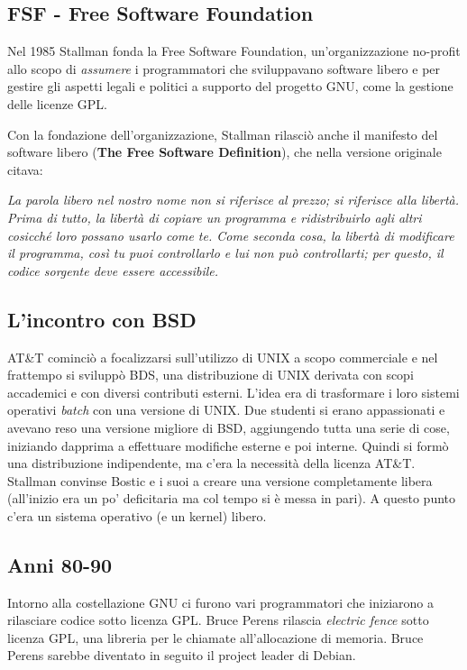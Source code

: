 \subsection{FSF - Free Software Foundation}

Nel 1985 Stallman fonda la Free Software Foundation, un'organizzazione no-profit allo scopo di \textit{assumere} i programmatori che sviluppavano software libero e per gestire gli aspetti legali e politici a supporto del progetto GNU, come la gestione delle licenze GPL.

Con la fondazione dell'organizzazione, Stallman rilasciò anche il manifesto del software libero (\textbf{The Free Software Definition}), che nella versione originale citava:

\begin{center}
	\textit{La parola libero nel nostro nome non si riferisce al prezzo; si riferisce alla libertà. Prima di tutto, la libertà di copiare un programma e ridistribuirlo agli altri cosicché loro possano usarlo come te. Come seconda cosa, la libertà di modificare il programma, così tu puoi controllarlo e lui non può controllarti; per questo, il codice sorgente deve essere accessibile.}
\end{center}


\subsection{L'incontro con BSD}

AT\&T cominciò a focalizzarsi sull'utilizzo di UNIX a scopo commerciale e nel frattempo si sviluppò BDS, una distribuzione di UNIX derivata con scopi accademici e con diversi contributi esterni. L'idea era di trasformare i loro sistemi operativi \textit{batch} con una versione di UNIX.
Due studenti si erano appassionati e avevano reso una versione migliore di BSD, aggiungendo tutta una serie di cose, iniziando dapprima a effettuare modifiche esterne e poi interne. Quindi si formò una distribuzione indipendente, ma c'era la necessità della licenza AT\&T. 
Stallman convinse Bostic e i suoi a creare una versione completamente libera (all'inizio era un po' deficitaria ma col tempo si è messa in pari). A questo punto c'era un sistema operativo (e un kernel) libero.

\subsection{Anni 80-90}

Intorno alla costellazione GNU ci furono vari programmatori che iniziarono a rilasciare codice sotto licenza GPL. Bruce Perens rilascia \textit{electric fence} sotto licenza GPL, una libreria per le chiamate all'allocazione di memoria. Bruce Perens sarebbe diventato in seguito il project leader di Debian.

